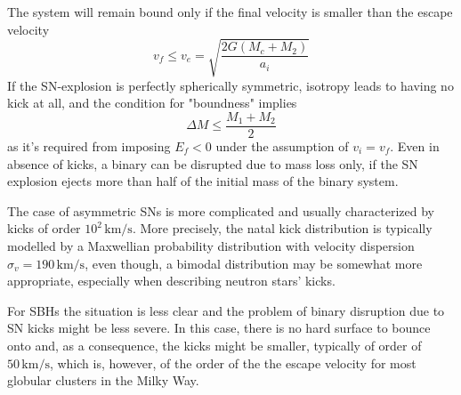 The system will remain bound only if the final velocity is smaller than the escape velocity
\begin{equation*}
    v_{f}\leq v_{e} = \sqrt{\frac{2G(M_{c}+M_{2})}{a_{i}}}
\end{equation*}
If the SN-explosion is perfectly spherically symmetric, isotropy leads to having no kick at all, and the condition for "boundness" implies 
\begin{equation*}
    \Delta M \leq \frac{M_{1}+M_{2}}{2}
\end{equation*}
as it's required from imposing $E_{f}<0$ under the assumption of $v_{i}=v_{f}$.
Even in absence of kicks, a binary can be disrupted due to mass loss only, if the SN explosion ejects more than half of the initial mass of the binary
system.
\par The case of asymmetric SNs is more complicated and usually characterized by kicks of order $10^{2}\,\text{km}/\text{s}$. More precisely, the natal
kick distribution is typically modelled by a Maxwellian probability distribution with velocity dispersion $\sigma_{v} = 190\,\text{km}/\text{s}$, even though, a bimodal distribution may be somewhat more appropriate, especially when describing neutron stars' kicks.
\par For SBHs the situation is less clear and the problem of binary disruption due to SN kicks might be less severe. In this case, there is no hard surface to bounce onto and, as a consequence, the kicks might be smaller, typically of order of $50\,\text{km}/\text{s}$, which is, however, of the order of the the escape velocity for most globular clusters in the Milky Way.
